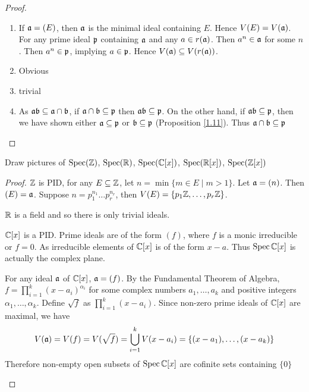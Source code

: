 \documentclass[11pt]{article}
\begin{document}
\begin{proof}
\begin{enumerate}
\item If \(\mathfrak{a}=(E)\), then \(\mathfrak{a}\) is the minimal ideal containing \(E\). Hence \(V(E)=V(\mathfrak{a})\). For
any prime ideal \(\mathfrak{p}\) containing \(\mathfrak{a}\) and any \(a\in r(\mathfrak{a})\). Then \(a^n\in\mathfrak{a}\) for some \(n\).
Then \(a^n\in\mathfrak{p}\), implying \(a\in\mathfrak{p}\). Hence \(V(\mathfrak{a})\subseteq V(r(\mathfrak{a}))\).
\item Obvious
\item trivial
\item As \(\mathfrak{a}\mathfrak{b}\subseteq\mathfrak{a}\cap\mathfrak{b}\), if \(\mathfrak{a}\cap\mathfrak{b}\subseteq\mathfrak{p}\) then \(\mathfrak{a}\mathfrak{b}\subseteq\mathfrak{p}\). On the other hand, if \(\mathfrak{a}\mathfrak{b}\subseteq\mathfrak{p}\), then we have shown
either \(\mathfrak{a}\subseteq\mathfrak{p}\) or \(\mathfrak{b}\subseteq\mathfrak{p}\) (Proposition \ref{1.11}). Thus \(\mathfrak{a}\cap\mathfrak{b}\subseteq\mathfrak{p}\)
\end{enumerate}
\end{proof}

\begin{exercise}
\label{ex1.16}
Draw pictures of \(\operatorname{Spec}(\mathbb{Z})\), \(\operatorname{Spec}(\mathbb{R})\), \(\operatorname{Spec}(\mathbb{C}[x])\), \(\operatorname{Spec}(\mathbb{R}[x])\), \(\operatorname{Spec}(\mathbb{Z}[x])\)
\end{exercise}

\begin{proof}
\(\mathbb{Z}\) is PID, for any \(E\subseteq\mathbb{Z}\), let \(n=\min\{m\in E\mid m> 1\}\). Let \(\mathfrak{a}=(n)\). Then \((E)=\mathfrak{a}\).
Suppose \(n=p_1^{n_1}\dots p_r^{n_r}\), then \(V(E)=\{p_1\mathbb{Z},\dots,p_r\mathbb{Z}\}\).

\(\mathbb{R}\) is a field and so there is only trivial ideals.

\(\mathbb{C}[x]\) is a PID. Prime ideals are of the form \((f)\), where \(f\) is a monic irreducible
or \(f=0\). As irreducible elements of \(\mathbb{C}[x]\) is of the form \(x-a\). Thus \(\operatorname{Spec}\mathbb{C}[x]\) is
actually the complex plane.

For any ideal \(\mathfrak{a}\) of \(\mathbb{C}[x]\), \(\mathfrak{a}=(f)\). By the Fundamental Theorem of
Algebra, \(f=\prod_{i=1}^k(x-a_i)^{\alpha_i}\) for some complex numbers \(a_1,\dots,a_k\) and positive
integers \(\alpha_1,\dots,\alpha_k\). Define \(\sqrt{f}\) as \(\prod_{i=1}^k(x-a_i)\). Since non-zero prime ideals
of \(\mathbb{C}[x]\) are maximal, we have
\begin{equation*}
V(\mathfrak{a})=V(f)=V(\sqrt{f})=\bigcup_{i=1}^kV(x-a_i)=\{(x-a_1),\dots,(x-a_k)\}
\end{equation*}
Therefore non-empty open subsets of \(\operatorname{Spec}\mathbb{C}[x]\) are cofinite sets containing \(\{0\}\)

\label{Problem1}
\end{proof}
\end{document}
